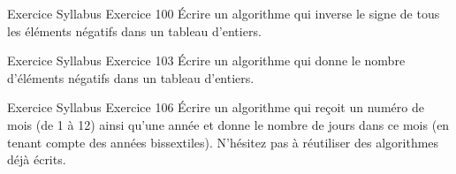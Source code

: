 \begin{frame}{Exercice \theexercice}{Syllabus Exercice 100}
    Écrire un algorithme qui
    inverse le signe de tous les éléments négatifs dans un tableau d’entiers.
\end{frame}

\begin{frame}{Exercice \theexercice}{Syllabus Exercice 103}
    Écrire un algorithme qui
    donne le nombre d’éléments négatifs dans un tableau d’entiers.
\end{frame}

\begin{frame}{Exercice \theexercice}{Syllabus Exercice 106}
    Écrire un algorithme qui reçoit un numéro de mois (de 1 à 12)
    ainsi qu’une année et donne le nombre de jours dans ce mois
    (en tenant compte des années bissextiles).
    N’hésitez pas à réutiliser des algorithmes déjà écrits.
\end{frame}
